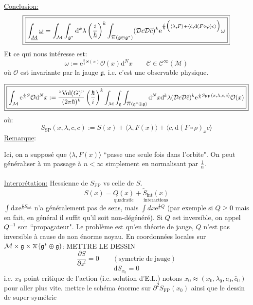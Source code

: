 \documentclass[a4paper,11pt]{article}
\renewcommand{\d}{{\mathrm{d}}}
\newcommand{\D}{{\mathcal{D}}}
\newcommand{\e}{{\mathrm{e}}}
\newcommand{\dr}[2]{\frac{\partial {#1}}{\partial{#2}}}
\newcommand{\ppi}{{\mathlarger{\mathlarger{\mathlarger{\pi}}}}}
\begin{document}
\underline{Conclusion:}
$$\boxed{\boxed{
\int_{\underline{\mathcal M}} \underline \omega = \int_\mathcal M \int_{\mathfrak g^*} \d^k\lambda \left(\frac i \hbar \right)^k \int_{\ppi(\mathfrak g \oplus \mathfrak g^*)} (\D c\D\bar c)^k \e^{\frac i\hbar \Big( \langle \lambda, F\rangle+\langle\bar c, \d(F\circ \varphi) c\rangle \Big)} \omega
}}$$
Et ce qui nous intéresse est:
$$\omega := \e^{\frac\hbar i S(x)} \mathcal{O}(x) \d^N x \quad \quad \mathcal{C}\in\mathcal{C}^\infty(\mathcal{M})$$
où $\mathcal{O}$ est invariante par la jauge $\mathfrak{g}$, i.e. c'est une observable physique.

$$\boxed{\boxed{
\int_\mathcal M \e^{\frac i\hbar S} \mathcal{O} \d^N x := \frac{``\mathrm{Vol}(G)"}{(2\pi\hbar)^k}\left(\frac\hbar i\right)^k \int_\mathcal M \int_\mathfrak g \int_{\ppi(\mathfrak g^*\oplus\mathfrak g)} \d^Nx\d^k\lambda(\D c\D\bar c)^k \e^{\frac i\hbar S_{\mathrm{FP}}(x,\lambda,c,\bar c)}\mathcal{O}(x)
}}$$
où:
$$\boxed{
S_\mathrm{SP}(x,\lambda,c,\bar c):= S(x)+ \langle\lambda,F(x)\rangle + \langle\bar c, \d(F\circ \rho)_x c\rangle
}$$
\underline{Remarque}:

Ici, on a supposé que $\langle\lambda, F(x)\rangle$ ``passe une seule fois dans l'orbite". On peut généraliser à un passage à $n<\infty$ simplement en normalisant par $\frac1n$.\\\\
\underline{Interprétation:} Hessienne de $S_\mathrm{FP}$ vs celle de $S$.
$$S(x) = \underset{\mathrm{quadratic}}{Q(x)}+ \underset{\mathrm{interactions}}{\tilde S_\mathrm{int}(x)}$$
$\int \d x \e^{\frac i\hbar S_\mathrm{int}}$ n'a généralement pas de sens, mais $\int d x \e^{\frac i\hbar Q}$ (par exemple si $Q\geq 0$ mais en fait, en général il suffit qu'il soit non-dégénéré). Si $Q$ est inversible, on appel $Q^{-1}$ son ``propagateur". Le problème est qu'en théorie de jauge, $Q$ n'est pas inversible à cause de non énorme noyau. En coordonnées locales sur $\mathcal M\times\mathfrak g\times\ppi(\mathfrak g^*\oplus\mathfrak g)$:
\color{red} METTRE LE DESSIN \color{black}
$$\dr S{z^i}=0\quad\quad(\mathrm{symetrie}\;\mathrm{de}\;\mathrm{jauge})$$
$$\boxed{\d S_{x_0}=0}$$
i.e. $x_0$ point critique de l'action (i.e. solution d'E.L.) notons $x_0\approx(x_0,\lambda_0,c_0,\bar c_0)$ pour aller plus vite. \color{red}mettre le schéma énorme sur $\partial^2 S_\mathrm{FP}(x_0)$ ainsi que le dessin de super-symétrie\color{black}
\end{document}
